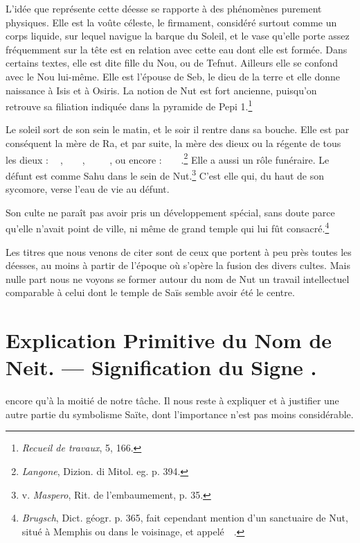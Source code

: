 \documentclass[letterpaper,twocolumn,openany,nodeprecatedcode]{dndbook}
\newcommand*\hieroAAAO{}
\newcommand*\hieroAACB{\raisebox{0.5ex}{}}
\newcommand*\hieroAACS{}
\newcommand*\hieroAACY{}
\newcommand*\hieroAAEK{}
\newcommand*\hieroAAEY{}
\newcommand*\hieroAAEZ{}
\newcommand*\hieroAAFS{}
\newcommand*\hieroAAHN{}
\newcommand*\hieroAAII{}
\newcommand*\hieroAAKP{}
\newcommand*\hieroAAMZ{}
\newcommand*\hieroAANC{}
\newcommand*\hieroAAPH{}
\newcommand*\hieroAAVQ{}
\newcommand*\hieroAAWJ{}
\newcommand*\hieroAAYG{}
\newcommand*\hieroABGF{}
\newcommand*\hieroABGR{}
\newcommand*\hieroABGS{}
\newcommand*\hieroABGT{\raisebox{0.3ex}{}}
\newcommand*\hieroABGU{}
\newcommand*\hieroABGV{}
\begin{document}
L'idée que représente cette déesse se rapporte à des phénomènes purement physiques. Elle est la voûte céleste, le firmament, considéré surtout comme un corps liquide, sur lequel navigue la barque du Soleil, et le vase qu'elle porte assez fréquemment sur la tête est en relation avec cette eau dont elle est formée. Dans certains textes, elle est dite fille du Nou, ou de Tefnut. Ailleurs elle se confond avec le Nou lui-même. Elle est l'épouse de Seb, le dieu de la terre et elle donne naissance à Isis et à Osiris. La notion de Nut est fort ancienne, puisqu'on retrouve sa filiation indiquée dans la pyramide de Pepi 1.\footnote{\emph{Recueil de travaux}, 5, 166.}

Le soleil sort de son sein le matin, et le soir il rentre dans sa bouche. Elle est par conséquent la mère de Ra, et par suite, la mère des dieux ou la régente de tous les dieux : $\hieroABGF\:\hieroAAFS\:\hieroAAPH\allowbreak\:\hieroAAWJ\:\hieroABGR$, $\hieroABGF\:\hieroAAMZ\:\hieroAANC\allowbreak\:\hieroAACB\:\hieroAACS\:\hieroAAEK\allowbreak\:\hieroAAEK\:\hieroAAEK$, $\hieroABGF\:\hieroAAEY\:\hieroAANC\allowbreak\:\hieroAACS\:\hieroAAEK\:\hieroAAEK\allowbreak\:\hieroAAEK\:\hieroABGS\:\hieroAAEZ\allowbreak\:\hieroAAWJ\:\hieroAAVQ$, ou encore : $\hieroABGF\:\hieroAAII\:\hieroAACY\allowbreak\:\hieroABGT\:\hieroABGU\:\hieroABGV\allowbreak\:\hieroAAKP\:\hieroAAYG$.\footnote{\emph{Langone}, Dizion. di Mitol. eg. p. 394.} Elle a aussi un rôle funéraire. Le défunt est comme Sahu dans le sein de Nut.\footnote{v. \emph{Maspero}, Rit. de l'embaumement, p. 35.} C'est elle qui, du haut de son sycomore, verse l'eau de vie au défunt.

Son culte ne paraît pas avoir pris un développement spécial, sans doute parce qu'elle n'avait point de ville, ni même de grand temple qui lui fût consacré.\footnote{\emph{Brugsch}, Dict. géogr. p. 365, fait cependant mention d'un sanctuaire de Nut, situé à Memphis ou dans le voisinage, et appelé $\hieroAAHN\:\hieroABGF\allowbreak\:\hieroAAII\:\hieroAACY$.}

Les titres que nous venons de citer sont de ceux que portent à peu près toutes les déesses, au moins à partir de l'époque où s'opère la fusion des divers cultes. Mais nulle part nous ne voyons se former autour du nom de Nut un travail intellectuel comparable à celui dont le temple de Saïs semble avoir été le centre.

\section{Explication Primitive du Nom de Neit. --- Signification du Signe $\hieroAAAO$.}
 encore qu'à la moitié de notre tâche. Il nous reste à expliquer et à justifier une autre partie du symbolisme Saïte, dont l'importance n'est pas moins considérable.
\end{document}

